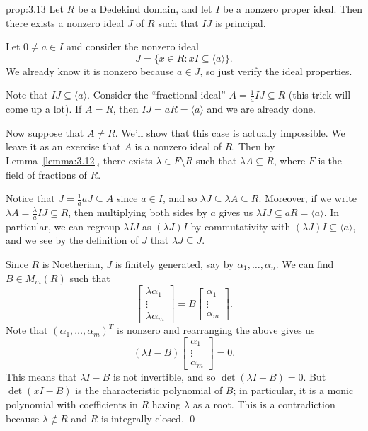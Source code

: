 \begin{prop}{prop:3.13}
    Let $R$ be a Dedekind domain, and let $I$ be a nonzero proper ideal. 
    Then there exists a nonzero ideal $J$ of $R$ such that $IJ$ is principal.
\end{prop}\vspace{-0.25cm}\newpage 
\begin{pf}
    Let $0 \neq a \in I$ and consider the nonzero ideal 
    \[ J = \{x \in R : xI \subseteq \langle a \rangle\}. \] 
    We already know it is nonzero because $a \in J$, so just verify the ideal 
    properties. 
    
    Note that $IJ \subseteq \langle a \rangle$. Consider the ``fractional ideal'' 
    $A = \frac1a IJ \subseteq R$ (this trick will come up a lot). If $A = R$, 
    then $IJ = aR = \langle a \rangle$ and we are already done. 

    Now suppose that $A \neq R$. We'll show that this case is actually impossible. 
    We leave it as an exercise that $A$ is a nonzero ideal of $R$. Then by 
    Lemma~\ref{lemma:3.12}, there exists $\lambda \in F \setminus R$ 
    such that $\lambda A \subseteq R$, where $F$ is the field of 
    fractions of $R$. 

    Notice that $J = \frac1a aJ \subseteq A$ since $a \in I$, and so 
    $\lambda J \subseteq \lambda A \subseteq R$. Moreover, if we write 
    $\lambda A = \frac{\lambda}{a} IJ \subseteq R$, then multiplying 
    both sides by $a$ gives us $\lambda IJ \subseteq aR = \langle a \rangle$. 
    In particular, we can regroup $\lambda IJ$ as $(\lambda J)I$ by 
    commutativity with $(\lambda J)I \subseteq \langle a \rangle$, and we see 
    by the definition of $J$ that $\lambda J \subseteq J$.

    Since $R$ is Noetherian, $J$ is finitely generated, say by 
    $\alpha_1, \dots, \alpha_n$. We can find $B \in M_m(R)$ such that 
    \[ \begin{bmatrix} \lambda\alpha_1 \\ \vdots \\ \lambda\alpha_m \end{bmatrix} 
    = B \begin{bmatrix} \alpha_1 \\ \vdots \\ \alpha_m \end{bmatrix}. \] 
    Note that $(\alpha_1, \dots, \alpha_m)^T$ is nonzero and rearranging 
    the above gives us 
    \[ (\lambda I - B) \begin{bmatrix} \alpha_1 \\ \vdots \\ \alpha_m \end{bmatrix}
    = 0. \] 
    This means that $\lambda I - B$ is not invertible, and so 
    $\det(\lambda I - B) = 0$. But $\det(xI - B)$ is the characteristic 
    polynomial of $B$; in particular, it is a monic polynomial with coefficients 
    in $R$ having $\lambda$ as a root. This is a contradiction because 
    $\lambda \notin R$ and $R$ is integrally closed. \qed
\end{pf}\vspace{-0.25cm}

